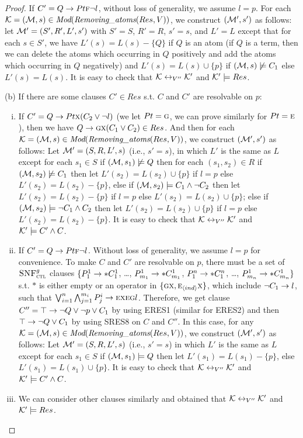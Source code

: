 \documentclass[twoside,11pt]{article}
\begin{document}
\begin{proof}
		If $C'= Q\rightarrow Pt \textsc{f} \neg l$, without loss of generality, we assume $l=p$.  For each ${\cal K}=({\cal M}, s)\in \textit{Mod}(\emph{Removing\_atoms}(Res, V))$, we construct $({\cal M}',s')$ as follows: let ${\cal M}'=(S', R', L', s')$ with $S'=S$, $R'=R$, $s'=s$, and $L'=L$ except that for each $s\in S'$, we have $L'(s) = L(s) - \{Q\}$ if $Q$ is an atom (if $Q$ is a term, then we can delete the atoms which occurring in $Q$ positively and add the atoms which occurring in $Q$ negatively) and $L'(s) = L(s) \cup \{p\}$ if $({\cal M}, s) \not \models C_1$ else $L'(s) = L(s)$.
		It is easy to check that ${\cal K} \leftrightarrow_{V''} {\cal K}'$ and ${\cal K}' \models Res$.
		
		(b) If there are some clauses $C'\in Res$ s.t. $C$ and $C'$ are resolvable on $p$:
		\begin{enumerate}[(i)]
			\item If $C'= Q\rightarrow Pt \textsc{x} (C_2 \vee \neg l)$ (we let $Pt=\textsc{g}$, we can prove similarly for $Pt = \textsc{e}$), then we have $Q\rightarrow \textsc{g} \textsc{x}(C_1 \vee C_2) \in Res$. And then for each ${\cal K}=({\cal M}, s)\in \textit{Mod}(\emph{Removing\_atoms}(Res, V))$, we construct $({\cal M}',s')$ as follows: Let ${\cal M}'= (S, R, L',s)$ (i.e., $s'=s$), in which $L'$ is the same as $L$ except for each $s_1\in S$ if $({\cal M}, s_1) \not \models Q$ then for each $(s_1, s_2) \in R$ if $({\cal M}, s_2) \not \models C_1$ then let $L'(s_2) = L(s_2) \cup \{p\}$ if $l=p$ else $L'(s_2) = L(s_2) - \{p\}$, else if $({\cal M}, s_2) \models  C_1 \wedge \neg C_2$ then let $L'(s_2) = L(s_2) - \{p\}$ if $l=p$ else $L'(s_2) = L(s_2) \cup \{p\}$; else if $({\cal M}, s_2) \models \neg C_1 \wedge C_2$ then let $L'(s_2) = L(s_2) \cup \{p\}$ if $l=p$ else $L'(s_2) = L(s_2) - \{p\}$. It is easy to check that ${\cal K} \leftrightarrow_{V''} {\cal K}'$ and ${\cal K}' \models C' \wedge C$.
			\item If $C' =  Q\rightarrow Pt \textsc{f} \neg l$. Without loss of generality, we assume $l=p$ for convenience. To make $C$ and $C'$ are resolvable on $p$, there must be a set of ${\textsc{SNF}_{\textsc{ctl}}^g}$ clauses $\{P_1^1 \rightarrow * C_1^1$, \dots, $P_{m_1}^1 \rightarrow * C_{m_1}^1$, $P_1^n \rightarrow * C_1^n$, \dots, $P_{m_n}^1 \rightarrow * C_{m_n}^1 \}$ s.t. $*$ is either empty or
			an operator in $\{\textsc{g} \textsc{x}, \textsc{e}_{{\langle{ind}\rangle}} \textsc{x}\}$, which include $\neg C_1 \rightarrow l$, such that $\bigvee_{i=1}^n \bigwedge_{j=1}^{m_i} P_j^i \rightarrow \textsc{e} \textsc{x} \textsc{e} \textsc{g} l$. Therefore, we get clause $C''=\top \rightarrow \neg Q \vee \neg p \vee C_1$ by using ERES1 (similar for ERES2) and then $\top \rightarrow \neg Q \vee C_1$ by using SRES8 on $C$ and $C''$. In this case, for any ${\cal K}=({\cal M}, s)\in \textit{Mod}(\emph{Removing\_atoms}(Res, V))$, we construct $({\cal M}',s')$ as follows: Let ${\cal M}'= (S, R, L',s)$ (i.e., $s'=s$) in which $L'$ is the same as $L$ except for each $s_1\in S$ if $({\cal M}, s_1) \models Q$ then let $L'(s_1) = L(s_1) - \{p\}$, else $L'(s_1) = L(s_1) \cup \{p\}$. It is easy to check that ${\cal K} \leftrightarrow_{V''} {\cal K}'$ and ${\cal K}' \models C' \wedge C$.
			\item We can consider other clauses similarly and obtained that ${\cal K} \leftrightarrow_{V''} {\cal K}'$ and ${\cal K}' \models Res$.
		\end{enumerate}
		

\end{proof}
\end{document}
